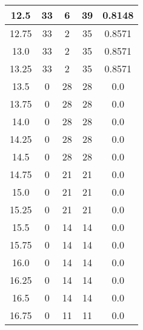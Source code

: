 \documentclass[letterpaper, 12pt]{article}
\begin{document}
\begin{longtable}{|c|c|c|c|c|}
12.5 & 33 & 6 & 39 & 0.8148 \\
\hline
12.75 & 33 & 2 & 35 & 0.8571 \\
\hline
13.0 & 33 & 2 & 35 & 0.8571 \\
\hline
13.25 & 33 & 2 & 35 & 0.8571 \\
\hline
13.5 & 0 & 28 & 28 & 0.0 \\
\hline
13.75 & 0 & 28 & 28 & 0.0 \\
\hline
14.0 & 0 & 28 & 28 & 0.0 \\
\hline
14.25 & 0 & 28 & 28 & 0.0 \\
\hline
14.5 & 0 & 28 & 28 & 0.0 \\
\hline
14.75 & 0 & 21 & 21 & 0.0 \\
\hline
15.0 & 0 & 21 & 21 & 0.0 \\
\hline
15.25 & 0 & 21 & 21 & 0.0 \\
\hline
15.5 & 0 & 14 & 14 & 0.0 \\
\hline
15.75 & 0 & 14 & 14 & 0.0 \\
\hline
16.0 & 0 & 14 & 14 & 0.0 \\
\hline
16.25 & 0 & 14 & 14 & 0.0 \\
\hline
16.5 & 0 & 14 & 14 & 0.0 \\
\hline
16.75 & 0 & 11 & 11 & 0.0 \\
\hline
\end{longtable}
\end{document}
